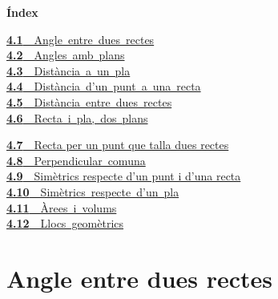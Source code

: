 \documentclass[11pt,a4paper]{article}
\newcommand{\fmuline}[1]{\textbf{\color{fmaccent}#1}}
\begin{document}
\begin{tcolorbox}[colback=fmsurface,colframe=fmsurface,arc=3mm,left=4mm,right=4mm,top=2mm,bottom=2mm]
\small\textbf{Índex}\par\smallskip
\begin{minipage}[t]{0.49\linewidth}\small \mbox{\hyperlink{sec1}{\textbf{\color{fmgreen}4.1}\ \ Angle entre dues rectes}}\\[1pt]
\mbox{\hyperlink{sec2}{\textbf{\color{fmgreen}4.2}\ \ Angles amb plans}}\\[1pt]
\mbox{\hyperlink{sec3}{\textbf{\color{fmgreen}4.3}\ \ Distància a un pla}}\\[1pt]
\mbox{\hyperlink{sec4}{\textbf{\color{fmgreen}4.4}\ \ Distància d'un punt a una recta}}\\[1pt]
\mbox{\hyperlink{sec5}{\textbf{\color{fmgreen}4.5}\ \ Distància entre dues rectes}}\\[1pt]
\mbox{\hyperlink{sec6}{\textbf{\color{fmgreen}4.6}\ \ Recta i pla, dos plans}}\\[3pt]\end{minipage}\hfill\begin{minipage}[t]{0.49\linewidth}\small \hyperlink{sec7}{\textbf{\color{fmgreen}4.7}\ \ Recta per un punt que talla dues rectes}\\[3pt]
\mbox{\hyperlink{sec8}{\textbf{\color{fmgreen}4.8}\ \ Perpendicular comuna}}\\[1pt]
\hyperlink{sec9}{\textbf{\color{fmgreen}4.9}\ \ Simètrics respecte d'un punt i d'una recta}\\[3pt]
\mbox{\hyperlink{sec10}{\textbf{\color{fmgreen}4.10}\ \ Simètrics respecte d'un pla}}\\[1pt]
\mbox{\hyperlink{sec11}{\textbf{\color{fmgreen}4.11}\ \ Àrees i volums}}\\[1pt]
\mbox{\hyperlink{sec12}{\textbf{\color{fmgreen}4.12}\ \ Llocs geomètrics}}\\[3pt]\end{minipage}
\end{tcolorbox}


\section{Angle entre dues rectes}\hypertarget{sec1}{}
\end{document}
